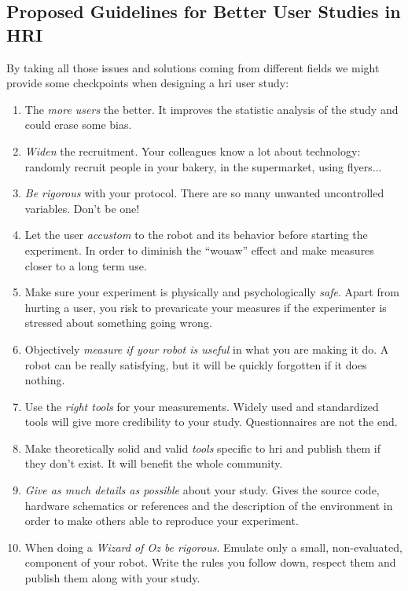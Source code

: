 \documentclass[a4paper,11pt,twoside]{StyleThese}
\begin{document}
\subsection{Proposed Guidelines for Better User Studies in HRI}
By taking all those issues and solutions coming from different fields we might provide some checkpoints when designing a \acrshort{hri} user study:
\begin{enumerate}
    \item The \textit{more users} the better. It improves the statistic analysis of the study and could erase some bias.
    \item \textit{Widen} the recruitment. Your colleagues know a lot about technology: randomly recruit people in your bakery, in the supermarket, using flyers...
    \item \textit{Be rigorous} with your protocol. There are so many unwanted uncontrolled variables. Don't be one!
    \item Let the user \textit{accustom} to the robot and its behavior before starting the experiment. In order to diminish the ``wouaw'' effect and make measures closer to a long term use.
    \item Make sure your experiment is physically and psychologically \textit{safe}. Apart from hurting a user, you risk to prevaricate your measures if the experimenter is stressed about something going wrong.
    \item Objectively \textit{measure if your robot is useful} in what you are making it do. A robot can be really satisfying, but it will be quickly forgotten if it does nothing.
    \item Use the \textit{right tools} for your measurements. Widely used and standardized tools will give more credibility to your study. Questionnaires are not the end.
    \item Make theoretically solid and valid \textit{tools} specific to \acrshort{hri} and publish them if they don't exist. It will benefit the whole community.
    \item \textit{Give as much details as possible} about your study. Gives the source code, hardware schematics or references and the description of the environment in order to make others able to reproduce your experiment.
    \item When doing a \textit{Wizard of Oz be rigorous}. Emulate only a small, non-evaluated, component of your robot. Write the rules you follow down, respect them and publish them along with your study.
\end{enumerate}
\end{document}
